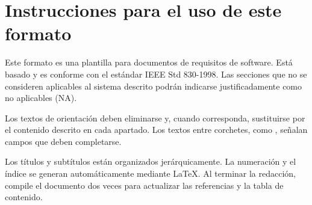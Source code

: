 \chapter*{Instrucciones para el uso de este formato}

Este formato es una plantilla para documentos de requisitos de software. Está basado y es conforme con el estándar IEEE Std 830-1998. Las secciones que no se consideren aplicables al sistema descrito podrán indicarse justificadamente como no aplicables (NA).

Los textos de orientación deben eliminarse y, cuando corresponda, sustituirse por el contenido descrito en cada apartado. Los textos entre corchetes, como , señalan campos que deben completarse.

Los títulos y subtítulos están organizados jerárquicamente. La numeración y el índice se generan automáticamente mediante LaTeX. Al terminar la redacción, compile el documento dos veces para actualizar las referencias y la tabla de contenido.
